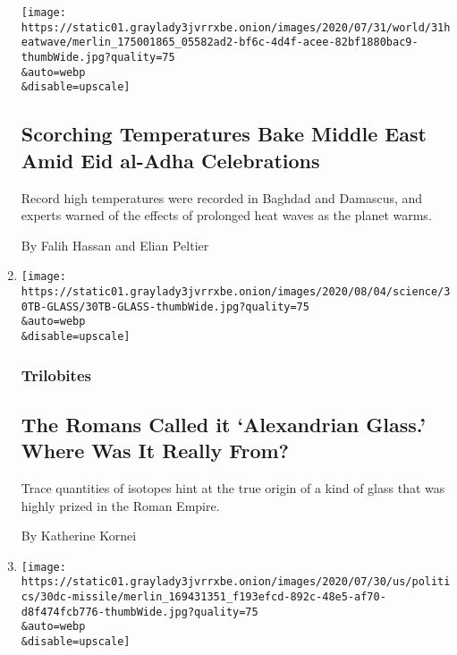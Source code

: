 \begin{enumerate}
  \texttt{[image: https://static01.graylady3jvrrxbe.onion/images/2020/07/31/world/31heatwave/merlin\_175001865\_05582ad2-bf6c-4d4f-acee-82bf1880bac9-thumbWide.jpg?quality=75\\\&auto=webp\\\&disable=upscale]}

  \hypertarget{scorching-temperatures-bake-middle-east-amid-eid-al-adha-celebrations}{%
  \subsection{Scorching Temperatures Bake Middle East Amid Eid al-Adha
  Celebrations}\label{scorching-temperatures-bake-middle-east-amid-eid-al-adha-celebrations}}

  Record high temperatures were recorded in Baghdad and Damascus, and
  experts warned of the effects of prolonged heat waves as the planet
  warms.

  By Falih Hassan and Elian Peltier
\item
  \href{/2020/07/31/science/alexandrian-glass-rome.html}{}

  \texttt{[image: https://static01.graylady3jvrrxbe.onion/images/2020/08/04/science/30TB-GLASS/30TB-GLASS-thumbWide.jpg?quality=75\\\&auto=webp\\\&disable=upscale]}

  \hypertarget{trilobites}{%
  \subsubsection{Trilobites}\label{trilobites}}

  \hypertarget{the-romans-called-it-alexandrian-glass-where-was-it-really-from}{%
  \subsection{The Romans Called it `Alexandrian Glass.' Where Was It
  Really
  From?}\label{the-romans-called-it-alexandrian-glass-where-was-it-really-from}}

  Trace quantities of isotopes hint at the true origin of a kind of
  glass that was highly prized in the Roman Empire.

  By Katherine Kornei
\item
  \href{/2020/07/30/world/asia/afghanistan-taliban-helicopter-missile.html}{}

  \texttt{[image: https://static01.graylady3jvrrxbe.onion/images/2020/07/30/us/politics/30dc-missile/merlin\_169431351\_f193efcd-892c-48e5-af70-d8f474fcb776-thumbWide.jpg?quality=75\\\&auto=webp\\\&disable=upscale]}

  \hypertarget{a-rarely-seen-weapon-destroys-a-helicopter-in-afghanistan}{%
}
\end{enumerate}
